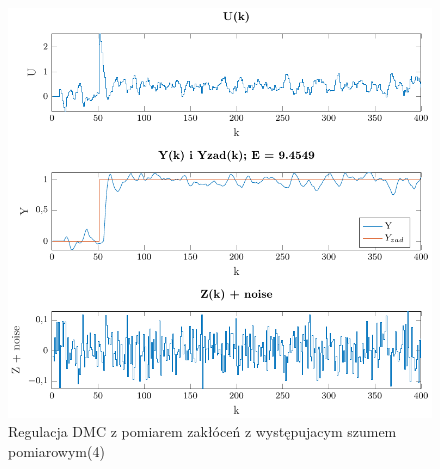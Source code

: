 \documentclass[a4paper,titlepage,11pt,twosides,floatssmall]{mwrep}
\begin{document}
\begin{figure}[h]
	\centering
	\includegraphics[scale=0.85]{../../Lab2/PDF_rysunki/Z7_Szum4.pdf}
	\caption{Regulacja DMC z pomiarem zakłóceń z występujacym szumem pomiarowym(4)}
	\label{szum4}
\end{figure}
\end{document}
